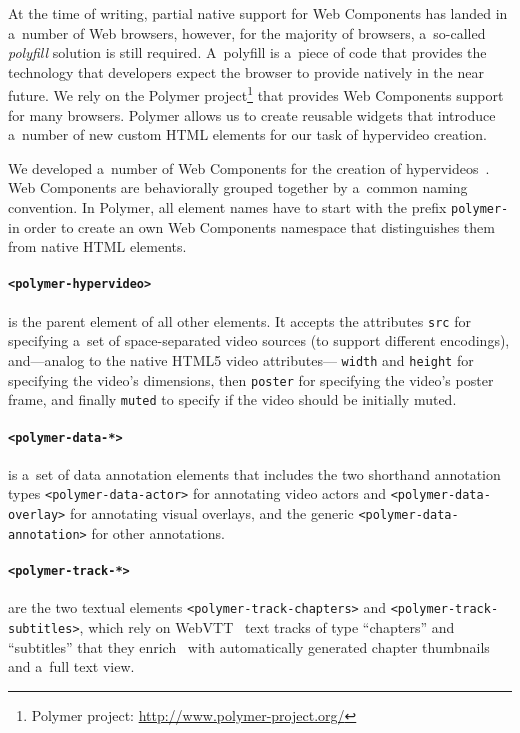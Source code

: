 \noindent At the time of writing, partial native support for Web Components
has landed in a~number of Web browsers,
however, for the majority of browsers,
a~so-called \emph{polyfill} solution is still required.
A~polyfill  is a~piece of code that provides the technology
that developers expect the browser to provide natively in the near future.
We rely on the Polymer project\footnote{Polymer project:
\url{http://www.polymer-project.org/}}
that provides Web Components support for many browsers.
Polymer allows us to create reusable widgets that introduce a~number of new
custom HTML elements for our task of hypervideo creation.

We developed a~number of Web Components for the creation of hypervideos~\cite{steiner2014hypervideo}.
Web Components are behaviorally grouped together by a~common naming convention.
In Polymer, all element names have to start with the prefix \texttt{polymer-}
in order to create an own Web Components namespace
that distinguishes them from native HTML elements.

\paragraph*{\texttt{<polymer-hypervideo>}} is the parent element of all other elements.
    It accepts the attributes \texttt{src} for specifying a~set of
    space-separated video sources (to support different encodings),
    and---analog to the native HTML5 video attributes---%
    \texttt{width} and \texttt{height} for specifying the video's dimensions,
    then \texttt{poster} for specifying the video's poster frame, and finally \texttt{muted} to specify if the video should be initially muted.

\paragraph*{\texttt{<polymer-data-*>}} is a~set of data annotation elements
    that includes the two shorthand annotation types
    \texttt{<polymer-data-actor>} for annotating video actors and
    \texttt{<polymer-data-overlay>} for annotating visual overlays,
    and the generic \texttt{<polymer-data-annotation>} for other annotations.

\paragraph*{\texttt{<polymer-track-*>}} are the two textual elements
    \texttt{<polymer-track-chapters>} and \texttt{<polymer-track-subtitles>},
    which rely on WebVTT~\cite{pfeiffer2013webvtt} text tracks
    of type ``chapters'' and ``subtitles'' that they enrich~\cite{steiner2014webvtt} with
    automatically generated chapter thumbnails and a~full text view.
    
